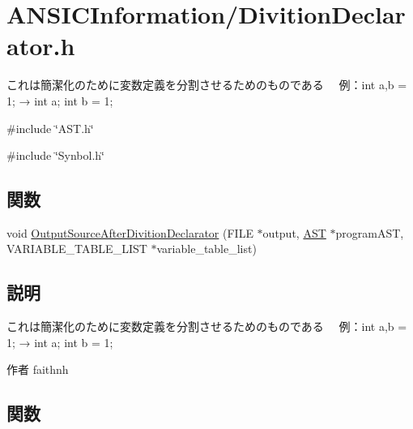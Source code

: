 \section{ANSICInformation/DivitionDeclarator.h}
\label{DivitionDeclarator_8h}


これは簡潔化のために変数定義を分割させるためのものである 　例：int a,b = 1; → int a; int b = 1;  


{\ttfamily \#include \char`\"{}AST.h\char`\"{}}\par
{\ttfamily \#include \char`\"{}Synbol.h\char`\"{}}\par
\subsection*{関数}
\begin{DoxyCompactItemize}
\item 
void \hyperlink{DivitionDeclarator_8h_a837cc79335c63eb0a21e7ead3516b06a}{OutputSourceAfterDivitionDeclarator} (FILE $\ast$output, \hyperlink{structabstract__syntax__tree}{AST} $\ast$programAST, VARIABLE\_\-TABLE\_\-LIST $\ast$variable\_\-table\_\-list)
\end{DoxyCompactItemize}


\subsection{説明}
これは簡潔化のために変数定義を分割させるためのものである 　例：int a,b = 1; → int a; int b = 1; \begin{DoxyAuthor}{作者}
faithnh 
\end{DoxyAuthor}


\subsection{関数}

